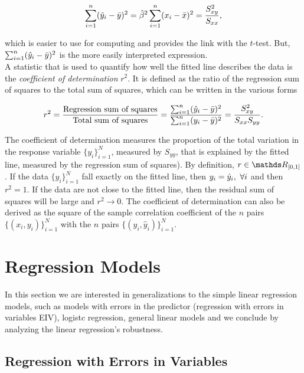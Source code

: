 \documentclass{homework}
\begin{document}
$$
\sum_{i=1}^{n} (\hat{y}_i - \bar{y})^2 = \hat{\beta}^2 \sum_{i=1}^{n} (x_i - \bar{x})^2 = \frac{S_{xy}^2}{S_{xx}},
$$

which is easier to use for computing and provides the link with the $t$-test. But, $\sum_{i=1}^{n} (\hat{y}_i - \bar{y})^2$ is the more easily interpreted expression. \\

A statistic that is used to quantify how well the fitted line describes the data is the \textit{coefficient of determination} $r^2$. It is defined as the ratio of the regression sum of squares to the total sum of squares, which can be written in the various forms 

\begin{align*}
    r^2 = \frac{\textnormal{Regression sum of squares}}{\textnormal{Total sum of squares}} = \frac{\sum_{i=1}^{n} (\hat{y}_i - \bar{y})^2}{\sum_{i=1}^{n} (y_i - \bar{y})^2} = \frac{S_{xy}^2}{S_{xx} S_{yy}}.
\end{align*}

The coefficient of determination measures the proportion of the total variation in the response variable $\{y_i\}_{i=1}^{N}$, measured by $S_{yy}$, that is explained by the fitted line, measured by the regression sum of squares). By definition, $r \in \R_{[0,1]}$. If the data $\{y_i\}_{i=1}^{N}$ fall exactly on the fitted line, then $y_i = \hat{y}_i, \textnormal{ } \forall i$ and then $r^2 = 1$. If the data are not close to the fitted line, then the residual sum of squares will be large and $r^2 \rightarrow 0$. The coefficient of determination can also be derived as the square of the sample correlation coefficient of the $n$ pairs $\{(x_i, y_i)\}_{i=1}^{N}$ with the $n$ pairs $\{(y_i, \hat{y}_i)\}_{i=1}^{N}$. \\

\clearpage

\section{Regression Models}

In this section we are interested in generalizations to the simple linear regression models, such as models with errors in the predictor (regression with errors in variables EIV), logistc regression, general linear models and we conclude by analyzing the linear regression's robustness. \\

\subsection{Regression with Errors in Variables}
\end{document}
